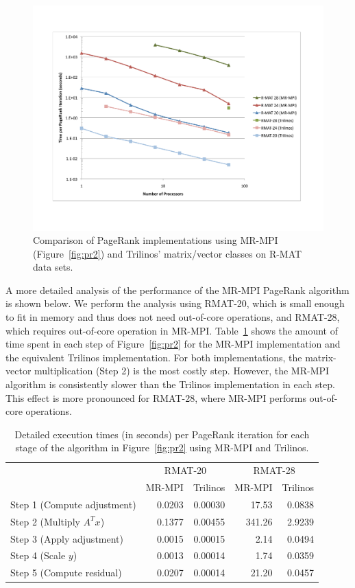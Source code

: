 \begin{figure}[htb]
\includegraphics[width=\textwidth]{fig_pagerank.pdf}
\caption{Comparison of PageRank implementations using 
MR-MPI (Figure~\ref{fig:pr2}) and 
Trilinos' matrix/vector classes on R-MAT data sets.}
\label{f:pr}
\end{figure}


A more detailed analysis of the performance of the MR-MPI PageRank
algorithm is shown below.  We perform the analysis using RMAT-20,
which is small enough to fit in memory and thus does not need
out-of-core operations, and RMAT-28, which requires out-of-core
operation in MR-MPI.  Table~\ref{table:prdetail} shows the amount of
time spent in each step of Figure~\ref{fig:pr2} for the MR-MPI
implementation and the equivalent Trilinos implementation.  For both
implementations, the matrix-vector multiplication (Step 2) is the most
costly step.  However, the MR-MPI algorithm is consistently slower
than the Trilinos implementation in each step.  This effect is more
pronounced for RMAT-28, where MR-MPI performs out-of-core operations.

\begin{table}[htb]
\begin{center}
\begin{tabular}{|l|r|r|r|r|}
\hline 
& \multicolumn{2}{|c|}{RMAT-20} & \multicolumn{2}{|c|}{RMAT-28} \\
& MR-MPI & Trilinos & MR-MPI & Trilinos  \\
\hline
Step 1 (Compute adjustment) & 0.0203 & 0.00030 & 17.53 & 0.0838 \\
Step 2 (Multiply $A^T x$) & 0.1377 & 0.00455 & 341.26 & 2.9239 \\
Step 3 (Apply adjustment) & 0.0015 & 0.00015 & 2.14 & 0.0494 \\
Step 4 (Scale $y$)  & 0.0013 & 0.00014 & 1.74 & 0.0359 \\
Step 5 (Compute residual)  & 0.0207 & 0.00014 & 21.20 & 0.0457 \\
\hline
\end{tabular}
\caption{Detailed execution times (in seconds) per PageRank iteration
for each stage of the algorithm
in Figure~\ref{fig:pr2} using MR-MPI and Trilinos.}
\label{table:prdetail}
\end{center}
\end{table}


